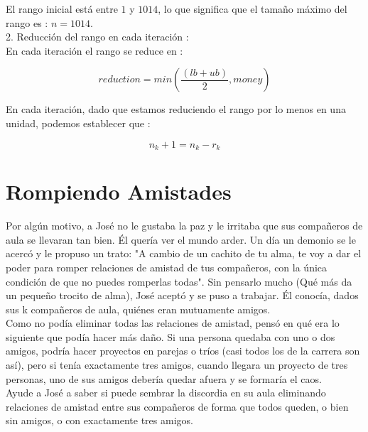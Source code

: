 \documentclass[
10pt, %
a4paper, %
oneside, %
headinclude,footinclude, %
BCOR5mm, %
]{scrartcl}
\begin{document}
El rango inicial está entre $1$ y $1014$, lo que significa que el tamaño máximo del rango es : $n = 1014$.\\

2. Reducción del rango en cada iteración : \\

En cada iteraci\'on el rango se reduce en :

$$
reduction = min(\frac{(lb+ub)}{2}, money)
$$

En cada iteración, dado que estamos reduciendo el rango por lo menos en una unidad, podemos establecer que :

$$
n_k+1 = n_k - r_k
$$



\section{Rompiendo Amistades}

Por algún motivo, a José no le gustaba la paz y le irritaba que sus compañeros de aula se llevaran tan bien. Él quería ver
el mundo arder. Un día un demonio se le acercó y le propuso un trato: "A cambio de un cachito de tu alma, te voy a dar el poder para
romper relaciones de amistad de tus compañeros, con la única condición de que no puedes romperlas todas". Sin pensarlo mucho (Qué más
da un pequeño trocito de alma), José aceptó y se puso a trabajar. Él conocía, dados sus k compañeros de aula, quiénes eran mutuamente
amigos.\\

Como no podía eliminar todas las relaciones de amistad, pensó en qué era lo siguiente que podía hacer más daño. Si una persona quedaba con
uno o dos amigos, podría hacer proyectos en parejas o tríos (casi todos los de la carrera son así), pero si tenía exactamente tres amigos,
cuando llegara un proyecto de tres personas, uno de sus amigos debería quedar afuera y se formaría el caos. \\

Ayude a José a saber si puede sembrar la discordia en su aula eliminando relaciones de amistad entre sus compañeros de forma que todos queden, o bien sin amigos, o con exactamente tres amigos.




\end{document}
